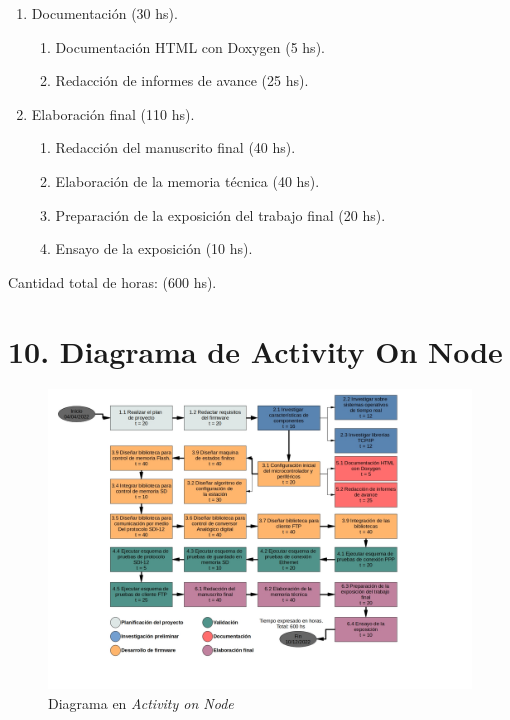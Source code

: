 \documentclass[
11pt, %
]{charter}
\begin{document}
\begin{enumerate}
\begin{enumerate}
	\end{enumerate}
\item Documentación (30 hs).
	\begin{enumerate}
	\item Documentación HTML con Doxygen (5 hs).
	\item Redacción de informes de avance (25 hs).
	
	\end{enumerate}
\item Elaboración final (110 hs).
	\begin{enumerate}
	\item Redacción del manuscrito final (40 hs).
	\item Elaboración de la memoria técnica (40 hs).
	\item Preparación de la exposición del trabajo final (20 hs).	
	\item Ensayo de la exposición (10 hs).
	\end{enumerate}
\end{enumerate}

Cantidad total de horas: (600 hs).

\section{10. Diagrama de Activity On Node}
\label{sec:AoN}


\begin{figure}[htpb]
\centering 
\includegraphics[width=1.35\textwidth]{./Figuras/diagramaAoN.jpg}
\caption{Diagrama en \textit{Activity on Node}}
\label{fig:AoN}
\end{figure}
\end{document}
